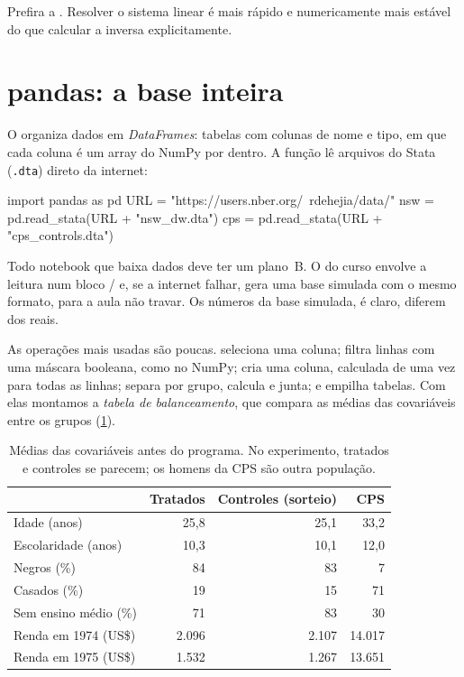 \begin{atencao}
Prefira  a . Resolver o
sistema linear é mais rápido e numericamente mais estável do que calcular a
inversa explicitamente.
\end{atencao}

\section{pandas: a base inteira}

O  organiza dados em \emph{DataFrames}: tabelas com colunas de nome
e tipo, em que cada coluna é um array do NumPy por dentro. A função
 lê arquivos do Stata (\texttt{.dta}) direto da internet:

\begin{codigo}
import pandas as pd
URL = "https://users.nber.org/~rdehejia/data/"
nsw = pd.read_stata(URL + "nsw_dw.dta")
cps = pd.read_stata(URL + "cps_controls.dta")
\end{codigo}

\begin{atencao}
Todo notebook que baixa dados deve ter um plano~B. O do curso envolve a leitura
num bloco / e, se a internet falhar, gera uma base simulada
com o mesmo formato, para a aula não travar. Os números da base simulada, é
claro, diferem dos reais.
\end{atencao}

As operações mais usadas são poucas.  seleciona uma coluna;
 filtra linhas com uma máscara booleana, como no NumPy;
 cria uma coluna, calculada de uma vez para todas as linhas;
 separa por grupo, calcula e junta; e
 empilha tabelas. Com elas montamos a \emph{tabela de
balanceamento}, que compara as médias das covariáveis entre os grupos
(\cref{tab:a02-balanco}).

\begin{table}[ht]
  \centering\small
  \caption{Médias das covariáveis antes do programa. No experimento, tratados e
  controles se parecem; os homens da CPS são outra população.}
  \label{tab:a02-balanco}
  \begin{tabular}{@{}lrrr@{}}
    \toprule
    & Tratados & Controles (sorteio) & CPS \\
    \midrule
    Idade (anos)              & 25,8  & 25,1  & 33,2 \\
    Escolaridade (anos)       & 10,3  & 10,1  & 12,0 \\
    Negros (\%)               & 84    & 83    & 7 \\
    Casados (\%)              & 19    & 15    & 71 \\
    Sem ensino médio (\%)     & 71    & 83    & 30 \\
    Renda em 1974 (US\$)      & 2.096 & 2.107 & 14.017 \\
    Renda em 1975 (US\$)      & 1.532 & 1.267 & 13.651 \\
    \bottomrule
  \end{tabular}
\end{table}

